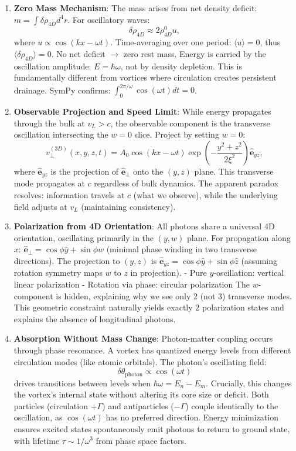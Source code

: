 \begin{enumerate}
\item \textbf{Zero Mass Mechanism}: The mass arises from net density deficit: $m = \int \delta\rho_{4D} d^4r$. For oscillatory waves:
   \[
   \delta\rho_{4D} \approx 2 \rho_{4D}^0 u,
   \]
   where $u \propto \cos(kx - \omega t)$. Time-averaging over one period: $\langle u \rangle = 0$, thus $\langle \delta\rho_{4D} \rangle = 0$. No net deficit $\to$ zero rest mass. Energy is carried by the oscillation amplitude: $E = \hbar\omega$, not by density depletion. This is fundamentally different from vortices where circulation creates persistent drainage. SymPy confirms: $\int_0^{2\pi/\omega} \cos(\omega t) dt = 0$.

\item \textbf{Observable Projection and Speed Limit}: While energy propagates through the bulk at $v_L > c$, the observable component is the transverse oscillation intersecting the $w=0$ slice. Project by setting $w=0$:
   \[
   v_\perp^{(3D)}(x,y,z,t) = A_0 \cos(kx - \omega t) \exp\left(-\frac{y^2 + z^2}{2\xi^2}\right) \hat{\mathbf{e}}_{yz},
   \]
   where $\hat{\mathbf{e}}_{yz}$ is the projection of $\hat{\mathbf{e}}_\perp$ onto the $(y,z)$ plane. This transverse mode propagates at $c$ regardless of bulk dynamics. The apparent paradox resolves: information travels at $c$ (what we observe), while the underlying field adjusts at $v_L$ (maintaining consistency).

\item \textbf{Polarization from 4D Orientation}: All photons share a universal 4D orientation, oscillating primarily in the $(y,w)$ plane. For propagation along $x$: $\hat{\mathbf{e}}_\perp = \cos\phi \hat{y} + \sin\phi \hat{w}$ (minimal phase winding in two transverse directions). The projection to $(y,z)$ is $\hat{\mathbf{e}}_{yz} = \cos\phi \hat{y} + \sin\phi \hat{z}$ (assuming rotation symmetry maps $w$ to $z$ in projection).
   - Pure $y$-oscillation: vertical linear polarization
   - Rotation via phase: circular polarization
   The $w$-component is hidden, explaining why we see only 2 (not 3) transverse modes. This geometric constraint naturally yields exactly 2 polarization states and explains the absence of longitudinal photons.

\item \textbf{Absorption Without Mass Change}: Photon-matter coupling occurs through phase resonance. A vortex has quantized energy levels from different circulation modes (like atomic orbitals). The photon's oscillating field:
   \[
   \delta\theta_{\text{photon}} \propto \cos(\omega t)
   \]
   drives transitions between levels when $\hbar\omega = E_n - E_m$. Crucially, this changes the vortex's internal state without altering its core size or deficit. Both particles (circulation $+\Gamma$) and antiparticles ($-\Gamma$) couple identically to the oscillation, as $\cos(\omega t)$ has no preferred direction. Energy minimization ensures excited states spontaneously emit photons to return to ground state, with lifetime $\tau \sim 1/\omega^3$ from phase space factors.


\end{enumerate}
